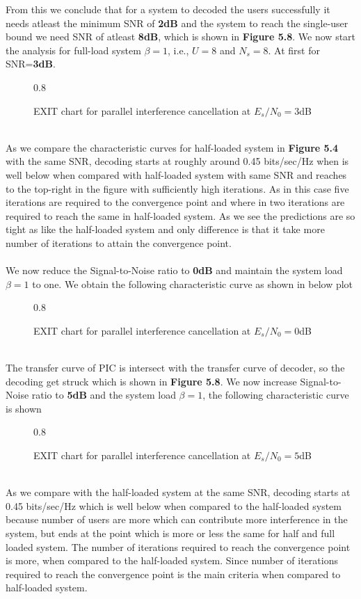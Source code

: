 From this we conclude that for a system to decoded the users successfully it needs atleast the minimum SNR of \textbf{2dB} and the system to reach the single-user bound we need SNR of atleast \textbf{8dB}, which is shown in \textbf{Figure 5.8}.
\newpage
We now start the analysis for full-load system $\beta=1$, i.e., $U=8$ and $N_s=8$. At first for SNR=\textbf{3dB}.
\begin{figure*}[htb]
\centerline{  {0.8}}
\caption{EXIT chart for parallel interference cancellation at $E_s/N_0=3$dB}
\end{figure*}\\
As we compare the characteristic curves for half-loaded system in \textbf{Figure 5.4} with the same SNR, decoding starts at roughly around 0.45 bits/sec/Hz when is well below when compared with half-loaded system with same SNR and reaches to the top-right in the figure with sufficiently high iterations. As in this case five iterations are required to the convergence point and where in two iterations are required to reach the same in half-loaded system. As we see the predictions are so tight as like the half-loaded system and only difference is that it take more number of iterations to attain the convergence point. \\ \\
We now reduce the Signal-to-Noise ratio to \textbf{0dB} and maintain the system load $\beta=1$ to one. We obtain the following characteristic curve as shown in below plot
\begin{figure*}[htb]
\centerline{  {0.8}}
\caption{EXIT chart for parallel interference cancellation at $E_s/N_0=0$dB }
\end{figure*}\\
The transfer curve of PIC is intersect with the transfer curve of decoder, so the decoding get struck which is shown in \textbf{Figure 5.8}.
\newpage
We now increase Signal-to-Noise ratio to \textbf{5dB} and the system load $\beta=1$, the following characteristic curve is shown
\begin{figure*}[htb]
\centerline{  {0.8}}
\caption{EXIT chart for parallel interference cancellation at $E_s/N_0=5$dB }
\end{figure*}\\
As we compare with the half-loaded system at the same SNR, decoding starts at 0.45 bits/sec/Hz which is well below when compared to the half-loaded system because number of users are more which can contribute more interference in the system, but ends at the point which is more or less the same for half and full loaded system. The number of iterations required to reach the convergence point is more, when compared to the half-loaded system. Since number of iterations required to reach the convergence point is the main criteria when compared to half-loaded system. \\ \\
